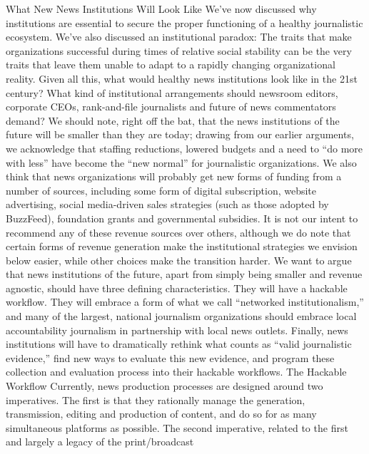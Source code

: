 What New News Institutions Will Look Like
We’ve now discussed why institutions are essential to secure the proper functioning
of a healthy journalistic ecosystem. We’ve also discussed an institutional
paradox: The traits that make organizations successful during times of relative
social stability can be the very traits that leave them unable to adapt to a rapidly
changing organizational reality. Given all this, what would healthy news institutions
look like in the 21st century? What kind of institutional arrangements
should newsroom editors, corporate CEOs, rank-and-file journalists and future
of news commentators demand?
We should note, right off the bat, that the news institutions of the future will be
smaller than they are today; drawing from our earlier arguments, we acknowledge
that staffing reductions, lowered budgets and a need to ``do more with less''
have become the ``new normal'' for journalistic organizations. We also think that
news organizations will probably get new forms of funding from a number of
sources, including some form of digital subscription, website advertising, social
media-driven sales strategies (such as those adopted by BuzzFeed), foundation
grants and governmental subsidies. It is not our intent to recommend any of
these revenue sources over others, although we do note that certain forms of revenue
generation make the institutional strategies we envision below easier, while
other choices make the transition harder.
We want to argue that news institutions of the future, apart from simply being
smaller and revenue agnostic, should have three defining characteristics. They will
have a hackable workflow. They will embrace a form of what we call ``networked
institutionalism,'' and many of the largest, national journalism organizations
should embrace local accountability journalism in partnership with local news
outlets. Finally, news institutions will have to dramatically rethink what counts as
``valid journalistic evidence,'' find new ways to evaluate this new evidence, and
program these collection and evaluation process into their hackable workflows.
The Hackable Workflow
Currently, news production processes are designed around two imperatives. The
first is that they rationally manage the generation, transmission, editing and production
of content, and do so for as many simultaneous platforms as possible. The
second imperative, related to the first and largely a legacy of the print/broadcast

